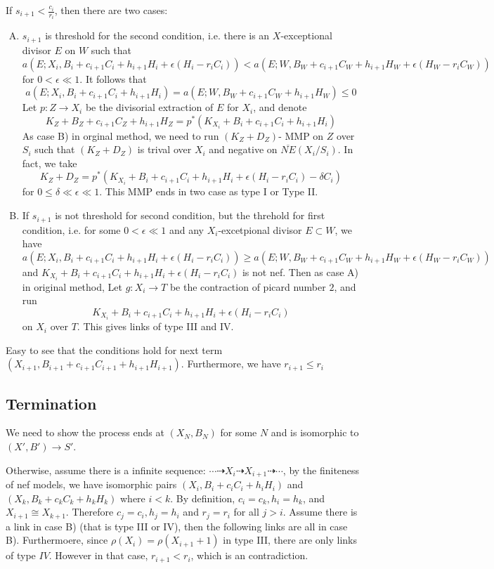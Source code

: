 \documentclass{article}
\begin{document}
If $  s_{i+1}<\frac{c_i}{r_i} $, then there are two cases:
\begin{enumerate}[A)]
	\item $ s_{i+1} $ is threshold for the second condition, i.e. there is an $ X $-exceptional divisor $ E $ on $ W $ such that 
	$$ a(E;X_i,B_i+c_{i+1}C_i+h_{i+1}H_i+\epsilon(H_i-r_iC_i)) < a(E;W,B_W+c_{i+1}C_W+h_{i+1}H_W+\epsilon(H_W-r_iC_W)) $$
	for $ 0<\epsilon\ll 1 $.  It follows that 
	$$ a(E;X_i,B_i+c_{i+1}C_i+h_{i+1}H_i) = a(E;W,B_W+c_{i+1}C_W+h_{i+1}H_W)\leqslant 0 $$
	Let $ p:Z\to X_i $ be the divisorial extraction of $ E $ for $ X_i $, and denote
	$$ K_Z+B_Z+c_{i+1}C_Z+h_{i+1}H_Z=p^*(K_{X_i}+B_i+c_{i+1}C_i+h_{i+1}H_i) $$
	As case B) in orginal method, we need to run $ (K_Z+D_Z) $- MMP on $ Z $ over $ S_i $ such that $  (K_Z+D_Z) $ is trival over $ X_i $ and negative on $ \overline{NE}(X_i/S_i) $.  In fact, we take
	$$  K_Z+D_Z=p^*(K_{X_i}+B_i+c_{i+1}C_i+h_{i+1}H_i+\epsilon(H_i-r_iC_i)-\delta C_i) $$
	for $ 0\leqslant \delta\ll \epsilon \ll 1 $. This MMP ends in two case as type I or Type II.
	\item If $ s_{i+1} $ is not threshold for second condition, but the threhold for first condition, i.e. for some $ 0<\epsilon \ll 1 $ and any $ X_i $-excetpional divisor $ E\subset W $, we have
	$$ a(E;X_i,B_i+c_{i+1}C_i+h_{i+1}H_i+\epsilon(H_i-r_iC_i)) \geqslant a(E;W,B_W+c_{i+1}C_W+h_{i+1}H_W+\epsilon(H_W-r_iC_W)) $$
	and $ K_{X_i}+B_i+c_{i+1}C_i+h_{i+1}H_i +\epsilon(H_i-r_iC_i)$ is not nef. Then as case A) in original method, Let $ g:X_i\to T $ be the contraction of picard number $ 2 $, and run
	$$ K_{X_i}+B_i+c_{i+1}C_i+h_{i+1}H_i +\epsilon(H_i-r_iC_i) $$
	on $ X_i $ over $ T $. This gives links of type III and IV.
\end{enumerate}
Easy to see that the conditions hold for next term $ (X_{i+1},B_{i+1}+c_{i+1}C_{i+1}+h_{i+1}H_{i+1}) $. Furthermore, we have $ r_{i+1}\leqslant r_i $
\subsection{Termination}
We need to show the process ends at $ (X_N,B_N) $ for some $ N $ and is isomorphic to $ (X',B')\to S' $.

Otherwise, assume there is a infinite sequence: $\cdots\dashrightarrow X_i\dashrightarrow X_{i+1}\dashrightarrow \cdots $, by the finiteness of nef models, we have isomorphic pairs $  (X_i,B_i+c_iC_i+h_iH_i) $ and $  (X_k,B_k+c_kC_k+h_kH_k) $ where $ i<k $. By definition, $ c_i=c_k,h_i=h_k $, and $ X_{i+1}\cong X_{k+1} $. Therefore $ c_j=c_i , h_j=h_i$ and $ r_j=r_i $ for all $ j>i $. Assume there is a link in case B) (that is type III or IV), then the following links are all in case B). Furthermoere, since $ \rho(X_i)=\rho(X_{i+1}+1) $ in type III, there are only links of type $ IV $. However in that case, $ r_{i+1}< r_i $, which is an contradiction.
\end{document}
